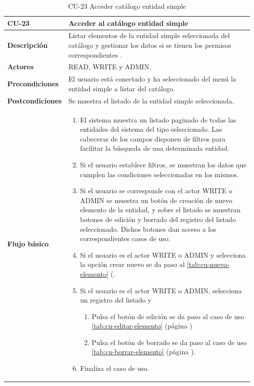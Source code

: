 \begin{table} [H]
    \centering
    \setlength{\leftmargini}{0.4cm}
	\resizebox{14cm}{!} { %
    \begin{tabular}{| m{3cm} | m{11cm} |}   
    \hline
	  \textbf{CU-23} & \textbf{Acceder al catálogo entidad simple} \\\hline
	  \textbf{Descripción} & Listar elementos de la entidad simple seleccionada del catálogo y gestionar los datos si se tienen los permisos correspondientes . \\\hline
	  \textbf{Actores} & READ, WRITE y ADMIN. \\\hline
	  \textbf{Precondiciones} & El usuario está conectado y ha seleccionado del menú la entidad simple a listar del catálogo. \\\hline
	  \textbf{Postcondiciones} & Se muestra el listado de la entidad simple seleccionada. \\\hline
	  \textbf{Flujo básico} & 
		\begin{enumerate}
	  	\item El sistema muestra un listado paginado de todas las entidades del sistema del tipo seleccionado. Las
cabeceras de los campos disponen de filtros para facilitar la búsqueda de una determinada entidad.
		\item Si el usuario establece filtros, se muestran los datos que cumplen las condiciones seleccionadas en los mismos.
		\item Si el usuario se corresponde con el actor WRITE o ADMIN se muestra un botón de creación de nuevo elemento de la entidad, y sobre el listado se muestran botones de edición y borrado del registro del listado seleccionado. Dichos botones dan acceso a los correspondientes casos de uso.
		\item Si el usuario es el actor WRITE o ADMIN y selecciona la opción crear nuevo se da paso al \ref{tab:cu-nuevo-elemento} (\pageref{tab:cu-nuevo-elemento}.
		\item Si el usuario es el actor WRITE o ADMIN, selecciona un registro del listado y
		    \begin{enumerate}
		        \item Pulsa el botón de edición se da paso al caso de uso \ref{tab:cu-editar-elemento} (página \pageref{tab:cu-editar-elemento})
		        \item Pulsa el botón de borrado se da paso al caso de uso \ref{tab:cu-borrar-elemento} (página \pageref{tab:cu-borrar-elemento}).
		    \end{enumerate} 
		\item Finaliza el caso de uso.		
	  \end{enumerate} 	  	  
	  \\\hline
    \end{tabular}
    } %
    \caption{CU-23 Acceder catálogo entidad simple}
    \label{tab:cu-listar-catalogo-simple}
\end{table}


